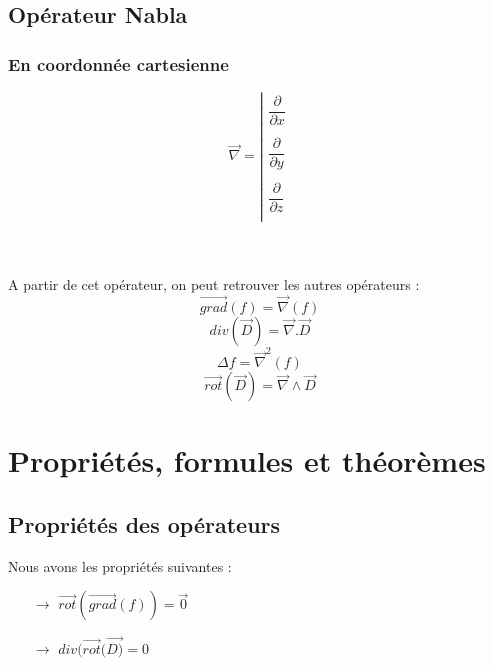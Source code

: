 \subsection{Opérateur Nabla}
\subsubsection{En coordonnée cartesienne}
\[ \overrightarrow{\nabla} = \left|
 \begin{array}{*{4}{c}}
\dfrac{\partial}{\partial x}\\
 			      \\
\dfrac{\partial }{\partial y}\\
			      \\
\dfrac{\partial }{\partial z}\\
\end{array} \right. \]\\\\
\begin{prop}
A partir de cet opérateur, on peut retrouver les autres opérateurs :
$$\overrightarrow{grad}(f) = \overrightarrow{\nabla}(f)$$
$$div(\overrightarrow{D}) = \overrightarrow{\nabla}.\overrightarrow{D}$$
$$\Delta f = \overrightarrow{\nabla}^2(f)$$
$$\overrightarrow{rot}(\overrightarrow{D}) = \overrightarrow{\nabla}\wedge\overrightarrow{D}$$
\end{prop}
\section{Propriétés, formules et théorèmes}
\subsection{Propriétés des opérateurs}
Nous avons les propriétés suivantes : \\
\begin{itemize}
 \item[$\rightarrow$] $\overrightarrow{rot}(\overrightarrow{grad}(f)) = \overrightarrow{0}$\\
 \item[$\rightarrow$] $div(\overrightarrow{rot}(\overrightarrow{D)}= 0$\\
\end{itemize}
